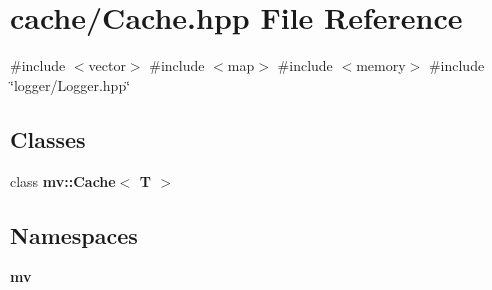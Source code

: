 \section{cache/\+Cache.hpp File Reference}
\label{_cache_8hpp}
{\ttfamily \#include $<$vector$>$}\newline
{\ttfamily \#include $<$map$>$}\newline
{\ttfamily \#include $<$memory$>$}\newline
{\ttfamily \#include \char`\"{}logger/\+Logger.\+hpp\char`\"{}}\newline
\subsection*{Classes}
\begin{DoxyCompactItemize}
\item 
class \textbf{ mv\+::\+Cache$<$ T $>$}
\end{DoxyCompactItemize}
\subsection*{Namespaces}
\begin{DoxyCompactItemize}
\item 
 \textbf{ mv}
\end{DoxyCompactItemize}
